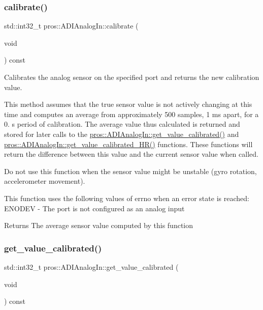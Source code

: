 \subsubsection{\texorpdfstring{calibrate()}{calibrate()}}
{\footnotesize\ttfamily std\+::int32\+\_\+t pros\+::\+A\+D\+I\+Analog\+In\+::calibrate (\begin{DoxyParamCaption}\item[{void}]{ }\end{DoxyParamCaption}) const}



Calibrates the analog sensor on the specified port and returns the new calibration value. 

This method assumes that the true sensor value is not actively changing at this time and computes an average from approximately 500 samples, 1 ms apart, for a 0. s period of calibration. The average value thus calculated is returned and stored for later calls to the \hyperlink{classpros_1_1ADIAnalogIn_a5930ce87c880833bda8cd202613b8d80}{pros\+::\+A\+D\+I\+Analog\+In\+::get\+\_\+value\+\_\+calibrated()} and \hyperlink{classpros_1_1ADIAnalogIn_a65bfed175ed1b0efce4566e78e7f9473}{pros\+::\+A\+D\+I\+Analog\+In\+::get\+\_\+value\+\_\+calibrated\+\_\+\+H\+R()} functions. These functions will return the difference between this value and the current sensor value when called.

Do not use this function when the sensor value might be unstable (gyro rotation, accelerometer movement).

This function uses the following values of errno when an error state is reached\+: E\+N\+O\+D\+EV -\/ The port is not configured as an analog input

\begin{DoxyReturn}{Returns}
The average sensor value computed by this function 
\end{DoxyReturn}
\mbox{\label{classpros_1_1ADIAnalogIn_a5930ce87c880833bda8cd202613b8d80}} 
\subsubsection{\texorpdfstring{get\+\_\+value\+\_\+calibrated()}{get\_value\_calibrated()}}
{\footnotesize\ttfamily std\+::int32\+\_\+t pros\+::\+A\+D\+I\+Analog\+In\+::get\+\_\+value\+\_\+calibrated (\begin{DoxyParamCaption}\item[{void}]{ }\end{DoxyParamCaption}) const}



